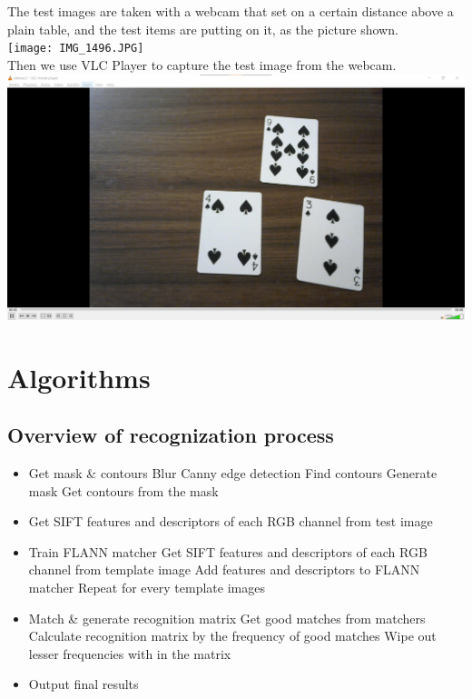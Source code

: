 \documentclass{article}
\begin{document}
\\\\
The test images are taken with a webcam that set on a certain distance above a plain table, and the test items are putting on it, as the picture shown.\\
\texttt{[image: IMG\_1496.JPG]}
\\
Then we use VLC Player to capture the test image from the webcam.\\
\includegraphics[scale=0.2]{vlc.png}

\section*{Algorithms}

\subsection*{Overview of recognization process}

\begin{itemize}
    \item Get mask \& contours
        \subitem Blur
        \subitem Canny edge detection
        \subitem Find contours
        \subitem Generate mask
        \subitem Get contours from the mask
    \item Get SIFT features and descriptors of each RGB channel from test image
    \item Train FLANN matcher
        \subitem Get SIFT features and descriptors of each RGB channel from template image
        \subitem Add features and descriptors to FLANN matcher
        \subitem Repeat for every template images
    \item Match \& generate recognition matrix
        \subitem Get good matches from matchers
        \subitem Calculate recognition matrix by the frequency of good matches
        \subitem Wipe out lesser frequencies with in the matrix
    \item Output final results
\end{itemize}
\end{document}
